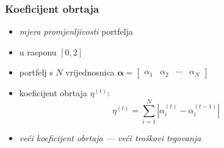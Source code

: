 \documentclass[11pt, notheorems]{beamer}
\newcommand{\q}{\left}
\newcommand{\w}{\right}
\newcommand{\matr}[1]{\mathbold{#1}}
\begin{document}
  \begin{frame}
    \frametitle{Koeficijent obrtaja}
    \begin{itemize}
      \item \emph{mjera promjenljivosti} portfelja
      \item u rasponu $\q[0, 2\w]$
      \item portfelj s $N$ vrijednosnica $\matr{\alpha} = \begin{bmatrix} \alpha_1 & \alpha_2 & \cdots & \alpha_N \end{bmatrix}$
      \item \alert{koeficijent obrtaja} $\eta^{(t)}$:
      \begin{equation*}
        \eta^{(t)} = \sum_{i=1}^{N} \q \lvert \alpha_i^{(t)} - \alpha_i^{(t-1)} \w \rvert
      \end{equation*}
      \item \emph{veći koeficijent obrtaja --- veći troškovi trgovanja}
    \end{itemize}
  \end{frame}
  
\end{document}

